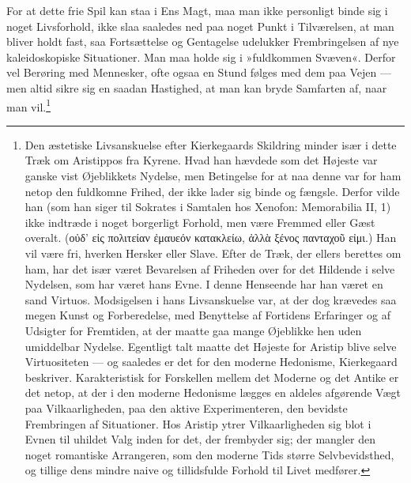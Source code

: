 \documentclass[12pt,a4paper,openany]{book}
\newcommand{\opage}[1]{\marginnote{\footnotesize\textit{[#1]}}}
\begin{document}
For at dette frie Spil kan staa i Ens Magt, maa
man ikke personligt binde sig i noget Livsforhold, ikke
\opage{84}slaa saaledes ned paa noget Punkt i Tilværelsen, at man
bliver holdt fast, saa Fortsættelse og Gentagelse udelukker
Frembringelsen af nye kaleidoskopiske Situationer.
Man maa holde sig i »fuldkommen Svæven«. Derfor vel
Berøring med Mennesker, ofte ogsaa en Stund følges med
dem paa Vejen --- men altid sikre sig en saadan Hastighed,
at man kan bryde Samfarten af, naar man vil.\footnote{Den æstetiske Livsanskuelse efter Kierkegaards Skildring minder især i dette Træk om Aristippos fra Kyrene. Hvad han hævdede som det Højeste var ganske vist Øjeblikkets Nydelse, men Betingelse for at naa denne var for ham netop den fuldkomne Frihed, der ikke lader sig binde og fængsle. Derfor vilde han (som han siger til Sokrates i Samtalen hos Xenofon: Memorabilia II, 1) ikke indtræde i noget borgerligt Forhold, men være Fremmed eller Gæst overalt. (οὐδ' εἰς πολιτείαν ἐμαυεόν κατακλείω, ἀλλὰ ξένος πανταχοῦ εἰμι.) Han vil være fri, hverken Hersker eller Slave. Efter de Træk, der ellers berettes om ham, har det især været Bevarelsen af Friheden over for det Hildende i selve Nydelsen, som har været hans Evne. I denne Henseende har han været en sand Virtuos. Modsigelsen i hans Livsanskuelse var, at der dog krævedes saa megen Kunst og Forberedelse, med Benyttelse af Fortidens Erfaringer og af Udsigter for Fremtiden, at der maatte gaa mange Øjeblikke hen uden umiddelbar Nydelse. Egentligt talt maatte det Højeste for Aristip blive selve Virtuositeten --- og saaledes er det for den moderne Hedonisme, Kierkegaard beskriver. Karakteristisk for Forskellen mellem det Moderne og det Antike er det netop, at der i den moderne Hedonisme lægges en aldeles afgørende Vægt paa Vilkaarligheden, paa den aktive Experimenteren, den bevidste Frembringen af Situationer. Hos Aristip ytrer Vilkaarligheden sig blot i Evnen til uhildet Valg inden for det, der frembyder sig; der mangler den noget romantiske Arrangeren, som den moderne Tids større Selvbevidsthed, og tillige dens mindre naive og tillidsfulde Forhold til Livet medfører.}
\end{document}
